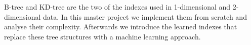 B-tree and KD-tree are the two of the indexes used in 1-dimensional and 2-dimensional data. In this master project we implement them from scratch and analyse their complexity. Afterwards we introduce the learned indexes that replace these tree structures with a machine learning approach.